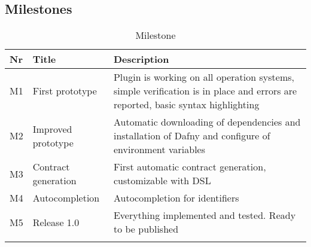 \subsection{Milestones}
\begin{longtable}[H]
	{l|p{}| p{}}
	\textbf{Nr} & \textbf{Title} & \textbf{Description} \\ 
	\hline\hline
	
	M1 & First prototype & Plugin is working on all operation systems, simple verification is in place and errors are reported, basic syntax highlighting \\ 
	
	M2 & Improved prototype & Automatic downloading of dependencies and installation of Dafny and configure of environment variables \\ 
	
	M3 & Contract generation & First automatic contract generation, customizable with DSL \\ 
	
	M4 & Autocompletion & Autocompletion for identifiers \\ 
	
	M5 & Release 1.0 & Everything implemented and tested. Ready to be published \\ 		
	\caption{Milestone}
	\label{tab:Milestone}
\end{longtable}